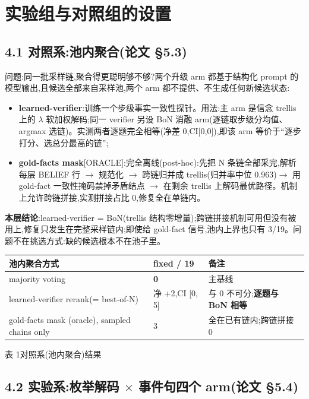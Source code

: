 \documentclass[fontset=none,10.5pt]{ctexart}
\begin{document}
\section{实验组与对照组的设置}

\subsection{4.1 对照系:池内聚合(论文 \S 5.3)}

问题:同一批采样链,聚合得更聪明够不够?两个升级 arm 都基于结构化 prompt 的模型输出,且候选全部来自采样池,两个 arm 都不提供、不生成任何新候选状态:

\begin{itemize}
\item \textbf{learned-verifier}:训练一个步级事实一致性探针。用法:主 arm 是信念 trellis 上的 $\lambda$ 软加权解码;同一 verifier 另设 BoN 消融 arm(逐链取步级分均值、argmax 选链)。实测两者逐题完全相等(净差 0,CI[0,0]),即该 arm 等价于``逐步打分、选总分最高的链'';
\item \textbf{gold-facts mask}[ORACLE]:完全离线(post-hoc):先把 N 条链全部采完,解析每层 BELIEF 行 $\to$ 规范化 $\to$ 跨链归并成 trellis(归并率中位 0.963)$\to$ 用 gold-fact 一致性掩码禁掉矛盾结点 $\to$ 在剩余 trellis 上解码最优路径。机制上允许跨链拼接,实测拼接占比 0,修复全在单链内。
\end{itemize}

\textbf{本层结论}:learned-verifier = BoN(trellis 结构零增量);跨链拼接机制可用但没有被用上,修复只发生在完整采样链内;即使给 gold-fact 信号,池内上界也只有 3/19。问题不在挑选方式:缺的候选根本不在池子里。

\begin{center}\small
\begin{tabular}{@{}lll@{}}
\toprule
\rowcolor{tabhead}池内聚合方式 & fixed / 19 & 备注 \\
\midrule
majority voting & \textbf{0} & 主基线 \\
learned-verifier rerank(= best-of-N) & 净 +2,CI [0, 5] & 与 0 不可分;\textbf{逐题与 BoN 相等} \\
gold-facts mask (oracle), sampled chains only & 3 & 全在已有链内;跨链拼接 0 \\
\bottomrule
\end{tabular}

{\small\color{black!60}表 1\quad 对照系(池内聚合)结果}
\end{center}

\subsection{4.2 实验系:枚举解码 $\times$ 事件句四个 arm(论文 \S 5.4)}
\end{document}
